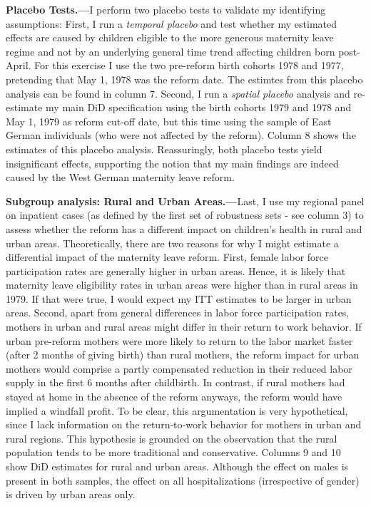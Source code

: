 \documentclass[11pt, a4paper,draft]{article} %
\begin{document}
\textbf{Placebo Tests.---}I perform two placebo tests to validate my identifying assumptions: First, I run a \textit{temporal placebo} and test whether my estimated effects are caused by children eligible to the more generous maternity leave regime and not by an underlying general time trend affecting children born post-April. For this exercise I use the two pre-reform birth cohorts 1978 and 1977, pretending that May 1, 1978 was the reform date. The estimtes from this placebo analysis can be found in column 7. Second, I run a \textit{spatial placebo} analysis and re-estimate my main DiD specification using the birth cohorts 1979 and 1978 and May 1, 1979 as reform cut-off date, but this time using the sample of East German individuals (who were not affected by the reform). Column 8 shows the estimates of this placebo analysis. Reassuringly, both placebo tests yield insignificant effects, supporting the notion that my main findings are indeed caused by the West German maternity leave reform.\newline

\textbf{Subgroup analysis: Rural and Urban Areas.---}Last, I use my regional panel on inpatient cases (as defined by the first set of robustness sets - see column 3) to assess whether the reform has a different impact on children's health in rural and urban areas. Theoretically, there are two reasons for why I might estimate a differential impact of the maternity leave reform. First, female labor force participation rates are generally higher in urban areas. Hence, it is likely that maternity leave eligibility rates in urban areas were higher than in rural areas in 1979. If that were true, I would expect my ITT estimates to be larger in urban areas. Second, apart from general differences in labor force participation rates, mothers in urban and rural areas might differ in their return to work behavior. If urban pre-reform mothers were more likely to return to the labor market faster (after 2 months of giving birth) than rural mothers, the reform impact for urban mothers would comprise a partly compensated reduction in their reduced labor supply in the first 6 months after childbirth. In contrast, if rural mothers had stayed at home in the absence of the reform anyways, the reform would have implied a windfall profit. To be clear, this argumentation is very hypothetical, since I lack information on the return-to-work behavior for mothers in urban and rural regions. This hypothesis is grounded on the observation that the rural population tends to be more traditional and conservative. Columns 9 and 10 show DiD estimates for rural and urban areas. Although the effect on males is present in both samples, the effect on all hospitalizations (irrespective of gender) is driven by urban areas only. \newline
\end{document}
